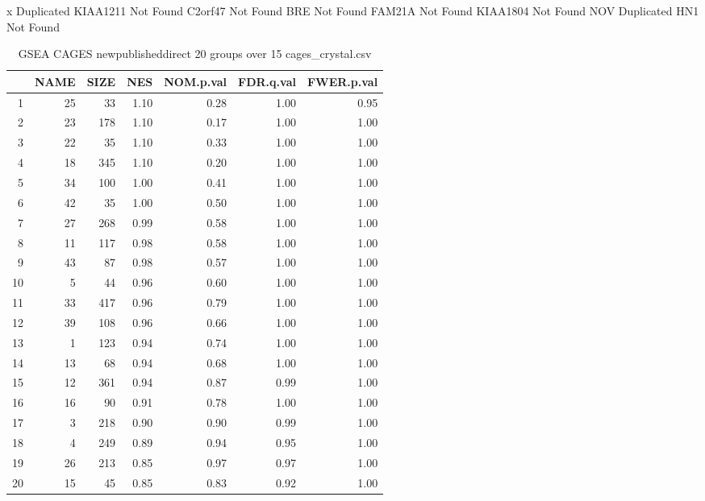 x	Duplicated
KIAA1211	Not Found
C2orf47	Not Found
BRE	Not Found
FAM21A	Not Found
KIAA1804	Not Found
NOV	Duplicated
HN1	Not Found
\begin{table}[ht]
\centering
\begin{tabular}{rrrrrrr}
  \hline
 & NAME & SIZE & NES & NOM.p.val & FDR.q.val & FWER.p.val \\ 
  \hline
1 &  25 &  33 & 1.10 & 0.28 & 1.00 & 0.95 \\ 
  2 &  23 & 178 & 1.10 & 0.17 & 1.00 & 1.00 \\ 
  3 &  22 &  35 & 1.10 & 0.33 & 1.00 & 1.00 \\ 
  4 &  18 & 345 & 1.10 & 0.20 & 1.00 & 1.00 \\ 
  5 &  34 & 100 & 1.00 & 0.41 & 1.00 & 1.00 \\ 
  6 &  42 &  35 & 1.00 & 0.50 & 1.00 & 1.00 \\ 
  7 &  27 & 268 & 0.99 & 0.58 & 1.00 & 1.00 \\ 
  8 &  11 & 117 & 0.98 & 0.58 & 1.00 & 1.00 \\ 
  9 &  43 &  87 & 0.98 & 0.57 & 1.00 & 1.00 \\ 
  10 &   5 &  44 & 0.96 & 0.60 & 1.00 & 1.00 \\ 
  11 &  33 & 417 & 0.96 & 0.79 & 1.00 & 1.00 \\ 
  12 &  39 & 108 & 0.96 & 0.66 & 1.00 & 1.00 \\ 
  13 &   1 & 123 & 0.94 & 0.74 & 1.00 & 1.00 \\ 
  14 &  13 &  68 & 0.94 & 0.68 & 1.00 & 1.00 \\ 
  15 &  12 & 361 & 0.94 & 0.87 & 0.99 & 1.00 \\ 
  16 &  16 &  90 & 0.91 & 0.78 & 1.00 & 1.00 \\ 
  17 &   3 & 218 & 0.90 & 0.90 & 0.99 & 1.00 \\ 
  18 &   4 & 249 & 0.89 & 0.94 & 0.95 & 1.00 \\ 
  19 &  26 & 213 & 0.85 & 0.97 & 0.97 & 1.00 \\ 
  20 &  15 &  45 & 0.85 & 0.83 & 0.92 & 1.00 \\ 
   \hline
\end{tabular}
\caption{GSEA CAGES newpublisheddirect 20 groups over 15 cages\_crystal.csv} 
\label{cages_crystal.csv}
\end{table}

